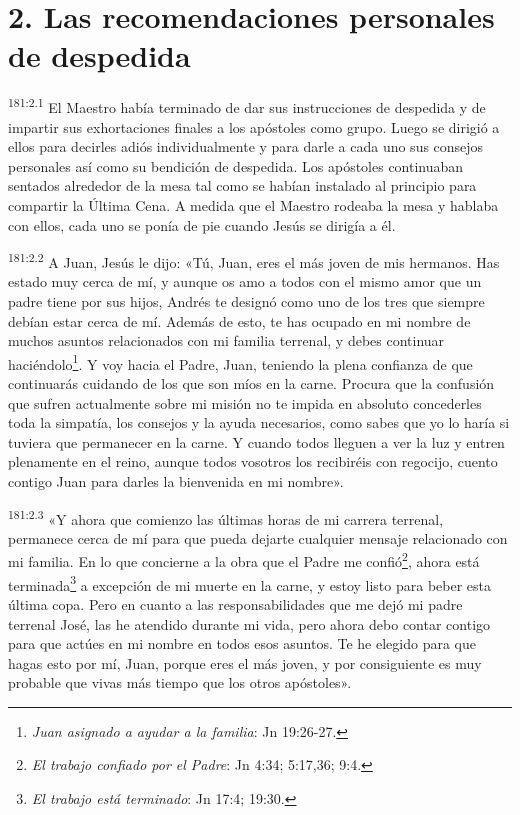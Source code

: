 \section*{2. Las recomendaciones personales de despedida}
\par
\textsuperscript{181:2.1} El Maestro había terminado de dar sus instrucciones de despedida y de impartir sus exhortaciones finales a los apóstoles como grupo. Luego se dirigió a ellos para decirles adiós individualmente y para darle a cada uno sus consejos personales así como su bendición de despedida. Los apóstoles continuaban sentados alrededor de la mesa tal como se habían instalado al principio para compartir la Última Cena. A medida que el Maestro rodeaba la mesa y hablaba con ellos, cada uno se ponía de pie cuando Jesús se dirigía a él.

\par
\textsuperscript{181:2.2} A Juan, Jesús le dijo: «Tú, Juan, eres el más joven de mis hermanos. Has estado muy cerca de mí, y aunque os amo a todos con el mismo amor que un padre tiene por sus hijos, Andrés te designó como uno de los tres que siempre debían estar cerca de mí. Además de esto, te has ocupado en mi nombre de muchos asuntos relacionados con mi familia terrenal, y debes continuar haciéndolo\footnote{\textit{Juan asignado a ayudar a la familia}: Jn 19:26-27.}. Y voy hacia el Padre, Juan, teniendo la plena confianza de que continuarás cuidando de los que son míos en la carne. Procura que la confusión que sufren actualmente sobre mi misión no te impida en absoluto concederles toda la simpatía, los consejos y la ayuda necesarios, como sabes que yo lo haría si tuviera que permanecer en la carne. Y cuando todos lleguen a ver la luz y entren plenamente en el reino, aunque todos vosotros los recibiréis con regocijo, cuento contigo Juan para darles la bienvenida en mi nombre».

\par
\textsuperscript{181:2.3} «Y ahora que comienzo las últimas horas de mi carrera terrenal, permanece cerca de mí para que pueda dejarte cualquier mensaje relacionado con mi familia. En lo que concierne a la obra que el Padre me confió\footnote{\textit{El trabajo confiado por el Padre}: Jn 4:34; 5:17,36; 9:4.}, ahora está terminada\footnote{\textit{El trabajo está terminado}: Jn 17:4; 19:30.} a excepción de mi muerte en la carne, y estoy listo para beber esta última copa. Pero en cuanto a las responsabilidades que me dejó mi padre terrenal José, las he atendido durante mi vida, pero ahora debo contar contigo para que actúes en mi nombre en todos esos asuntos. Te he elegido para que hagas esto por mí, Juan, porque eres el más joven, y por consiguiente es muy probable que vivas más tiempo que los otros apóstoles».

